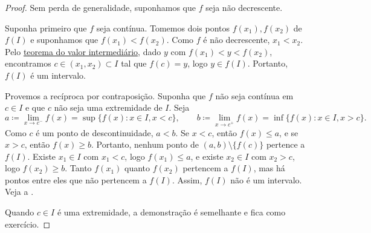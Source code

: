 \begin{proof}
Sem perda de generalidade, suponhamos que $f$ seja não decrescente.

Suponha primeiro que $f$ seja contínua. Tomemos dois pontos
$f(x_1), f(x_2)$ de $f(I)$ e suponhamos que
$f(x_1) < f(x_2)$.
Como $f$ é não decrescente, $x_1 < x_2$. Pelo
\hyperref[IVT:thm]{teorema do valor intermediário},
dado $y$ com $f(x_1) < y < f(x_2)$, encontramos
$c \in (x_1,x_2) \subset I$ tal que $f(c) = y$, logo $y \in f(I)$.
Portanto, $f(I)$ é um intervalo.

Provemos a recíproca por contraposição.
Suponha que $f$ não seja contínua em $c \in I$
e que $c$ não seja uma extremidade de $I$.
Seja
\begin{equation*}
a
\coloneqq \lim_{x \to c^-} f(x) = \sup \bigl\{ f(x) : x \in I, x < c \bigr\} ,
\qquad
b
\coloneqq \lim_{x \to c^+} f(x) = \inf \bigl\{ f(x) : x \in I, x > c \bigr\} .
\end{equation*}
Como $c$ é um ponto de descontinuidade, $a < b$.
Se $x < c$, então $f(x) \leq a$, e
se $x > c$, então $f(x) \geq b$. Portanto,
nenhum ponto de
$(a,b) \setminus \bigl\{ f(c) \bigr\}$ pertence a $f(I)$.
Existe $x_1 \in I$ com $x_1 < c$, logo
$f(x_1) \leq a$, e existe $x_2 \in I$ com $x_2 > c$,
logo $f(x_2) \geq b$. Tanto $f(x_1)$ quanto $f(x_2)$ pertencem a $f(I)$,
mas há pontos entre eles que não pertencem a $f(I)$.
Assim, $f(I)$ não é um intervalo. Veja a .

Quando $c \in I$ é uma extremidade, a demonstração é semelhante e fica como exercício.
\end{proof}

\begin{myfigureht}
\caption{Descontinuidade da função não decrescente $f \colon I \to \R$ em
$c$.\label{fig:figinccont}}
\end{myfigureht}

